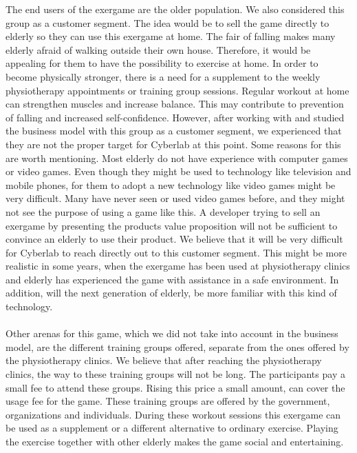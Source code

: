 The end users of the exergame are the older population. We also considered this group as a customer segment. The idea would be to sell the game directly to elderly so they can use this exergame at home. The fair of falling makes many elderly afraid of walking outside their own house. Therefore, it would be appealing for them to have the possibility to exercise at home. In order to become physically stronger, there is a need for a supplement to the weekly physiotherapy appointments or training group sessions. Regular workout at home can strengthen muscles and increase balance.  This may contribute to prevention of falling and increased self-confidence. However, after working with and studied the business model with this group as a customer segment, we experienced that they are not the proper target for Cyberlab at this point. Some reasons for this are worth mentioning. Most elderly do not have experience with computer games or video games. Even though they might be used to technology like television and mobile phones, for them to adopt a new technology like video games might be very difficult. Many have never seen or used video games before, and they might not see the purpose of using a game like this. A developer trying to sell an exergame by presenting the products value proposition will not be sufficient to convince an elderly to use their product. We believe that it will be very difficult for Cyberlab to reach directly out to this customer segment. This might be more realistic in some years, when the exergame has been used at physiotherapy clinics and elderly has experienced the game with assistance in a safe environment. In addition, will the next generation of elderly, be more familiar with this kind of technology.  \\ \\
Other arenas for this game, which we did not take into account in the business model, are the different training groups offered, separate from the ones offered by the physiotherapy clinics. We believe that after reaching the physiotherapy clinics, the way to these training groups will not be long. The participants pay a small fee to attend these groups. Rising this price a small amount, can cover the usage fee for the game. These training groups are offered by the government, organizations and individuals. During these workout sessions this exergame can be used as a supplement or a different alternative to ordinary exercise. Playing the exercise together with other elderly makes the game social and entertaining. \\ \\
